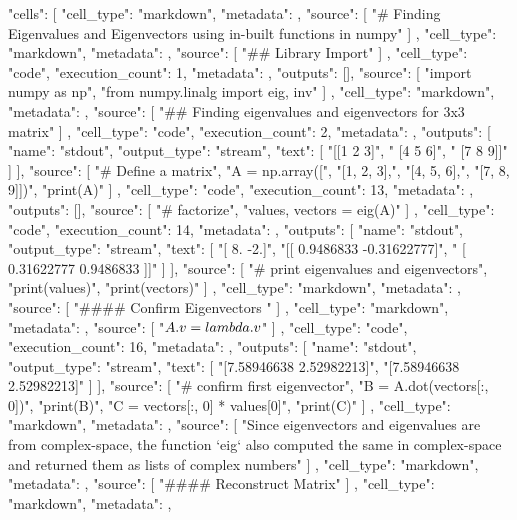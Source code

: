 {
 "cells": [
  {
   "cell_type": "markdown",
   "metadata": {},
   "source": [
    "# Finding Eigenvalues and Eigenvectors using in-built functions in numpy"
   ]
  },
  {
   "cell_type": "markdown",
   "metadata": {},
   "source": [
    "## Library Import"
   ]
  },
  {
   "cell_type": "code",
   "execution_count": 1,
   "metadata": {},
   "outputs": [],
   "source": [
    "import numpy as np\n",
    "from numpy.linalg import eig, inv"
   ]
  },
  {
   "cell_type": "markdown",
   "metadata": {},
   "source": [
    "## Finding eigenvalues and eigenvectors for 3x3 matrix"
   ]
  },
  {
   "cell_type": "code",
   "execution_count": 2,
   "metadata": {},
   "outputs": [
    {
     "name": "stdout",
     "output_type": "stream",
     "text": [
      "[[1 2 3]\n",
      " [4 5 6]\n",
      " [7 8 9]]\n"
     ]
    }
   ],
   "source": [
    "# Define a matrix\n",
    "A = np.array([\n",
    "[1, 2, 3],\n",
    "[4, 5, 6],\n",
    "[7, 8, 9]])\n",
    "print(A)"
   ]
  },
  {
   "cell_type": "code",
   "execution_count": 13,
   "metadata": {},
   "outputs": [],
   "source": [
    "# factorize\n",
    "values, vectors = eig(A)"
   ]
  },
  {
   "cell_type": "code",
   "execution_count": 14,
   "metadata": {},
   "outputs": [
    {
     "name": "stdout",
     "output_type": "stream",
     "text": [
      "[ 8. -2.]\n",
      "[[ 0.9486833  -0.31622777]\n",
      " [ 0.31622777  0.9486833 ]]\n"
     ]
    }
   ],
   "source": [
    "# print eigenvalues and eigenvectors\n",
    "print(values)\n",
    "print(vectors)"
   ]
  },
  {
   "cell_type": "markdown",
   "metadata": {},
   "source": [
    "#### Confirm Eigenvectors "
   ]
  },
  {
   "cell_type": "markdown",
   "metadata": {},
   "source": [
    "$A.v = \\lambda.v$"
   ]
  },
  {
   "cell_type": "code",
   "execution_count": 16,
   "metadata": {},
   "outputs": [
    {
     "name": "stdout",
     "output_type": "stream",
     "text": [
      "[7.58946638 2.52982213]\n",
      "[7.58946638 2.52982213]\n"
     ]
    }
   ],
   "source": [
    "# confirm first eigenvector\n",
    "B = A.dot(vectors[:, 0])\n",
    "print(B)\n",
    "C = vectors[:, 0] * values[0]\n",
    "print(C)"
   ]
  },
  {
   "cell_type": "markdown",
   "metadata": {},
   "source": [
    "Since eigenvectors and eigenvalues are from complex-space, the function `eig` also computed the same in complex-space and returned them as lists of complex numbers"
   ]
  },
  {
   "cell_type": "markdown",
   "metadata": {},
   "source": [
    "#### Reconstruct Matrix"
   ]
  },
  {
   "cell_type": "markdown",
   "metadata": {},
}}
